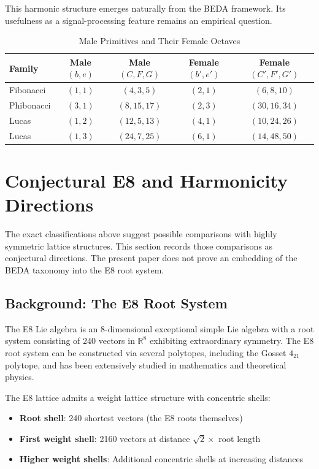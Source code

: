 \documentclass[12pt]{article}
\begin{document}
This harmonic structure emerges naturally from the BEDA framework. Its usefulness as a signal-processing feature remains an empirical question.

\begin{table}[h!]
\centering
\caption{Male Primitives and Their Female Octaves}
\label{tab:gender}
\small
\begin{tabular}{lcccc}
\toprule
\textbf{Family} & \textbf{Male $(b,e)$} & \textbf{Male $(C,F,G)$} & \textbf{Female $(b',e')$} & \textbf{Female $(C',F',G')$} \\
\midrule
Fibonacci & $(1,1)$ & $(4,3,5)$ & $(2,1)$ & $(6,8,10)$ \\
Phibonacci & $(3,1)$ & $(8,15,17)$ & $(2,3)$ & $(30,16,34)$ \\
Lucas & $(1,2)$ & $(12,5,13)$ & $(4,1)$ & $(10,24,26)$ \\
Lucas & $(1,3)$ & $(24,7,25)$ & $(6,1)$ & $(14,48,50)$ \\
\bottomrule
\end{tabular}
\end{table}

\section{Conjectural E8 and Harmonicity Directions}

The exact classifications above suggest possible comparisons with highly symmetric lattice structures. This section records those comparisons as conjectural directions. The present paper does not prove an embedding of the BEDA taxonomy into the E8 root system.

\subsection{Background: The E8 Root System}

The E8 Lie algebra is an 8-dimensional exceptional simple Lie algebra with a root system consisting of 240 vectors in $\mathbb{R}^8$ exhibiting extraordinary symmetry. The E8 root system can be constructed via several polytopes, including the Gosset $4_{21}$ polytope, and has been extensively studied in mathematics and theoretical physics.

The E8 lattice admits a weight lattice structure with concentric shells:
\begin{itemize}
\item \textbf{Root shell}: 240 shortest vectors (the E8 roots themselves)
\item \textbf{First weight shell}: 2160 vectors at distance $\sqrt{2} \times$ root length
\item \textbf{Higher weight shells}: Additional concentric shells at increasing distances
\end{itemize}
\end{document}
